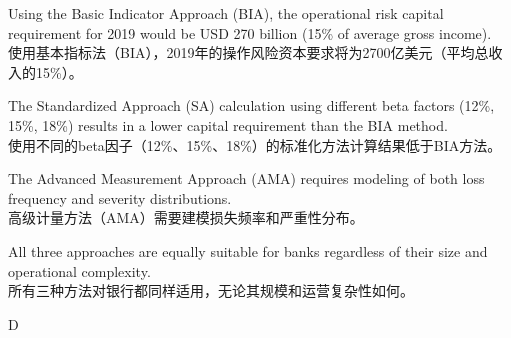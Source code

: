 \documentclass{article}
\begin{document}
    \begin{choices}
        \item Using the Basic Indicator Approach (BIA), the operational risk capital requirement for 2019 would be USD 270 billion (15\% of average gross income).
        \\使用基本指标法（BIA），2019年的操作风险资本要求将为2700亿美元（平均总收入的15\%）。
        \item The Standardized Approach (SA) calculation using different beta factors (12\%, 15\%, 18\%) results in a lower capital requirement than the BIA method.
        \\使用不同的beta因子（12\%、15\%、18\%）的标准化方法计算结果低于BIA方法。
        \item The Advanced Measurement Approach (AMA) requires modeling of both loss frequency and severity distributions.
        \\高级计量方法（AMA）需要建模损失频率和严重性分布。
        \item All three approaches are equally suitable for banks regardless of their size and operational complexity.
        \\所有三种方法对银行都同样适用，无论其规模和运营复杂性如何。
    \end{choices}
    
    \begin{correctanswer}
        D
    \end{correctanswer}
    
\end{document}
